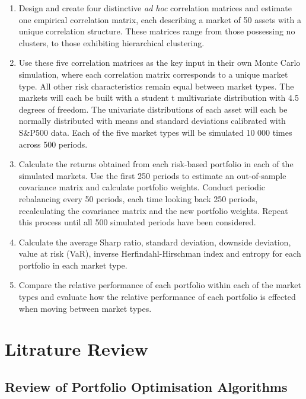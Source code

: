 \documentclass[11pt,preprint, authoryear]{elsarticle}
\numberwithin{equation}{section}
\numberwithin{figure}{section}
\numberwithin{table}{section}
\begin{document}
\begin{enumerate}
\def\labelenumi{\arabic{enumi}.}
\item
  Design and create four distinctive \emph{ad hoc} correlation matrices
  and estimate one empirical correlation matrix, each describing a
  market of 50 assets with a unique correlation structure. These
  matrices range from those possessing no clusters, to those exhibiting
  hierarchical clustering.
\item
  Use these five correlation matrices as the key input in their own
  Monte Carlo simulation, where each correlation matrix corresponds to a
  unique market type. All other risk characteristics remain equal
  between market types. The markets will each be built with a student t
  multivariate distribution with 4.5 degrees of freedom. The univariate
  distributions of each asset will each be normally distributed with
  means and standard deviations calibrated with S\&P500 data. Each of
  the five market types will be simulated 10 000 times across 500
  periods.
\item
  Calculate the returns obtained from each risk-based portfolio in each
  of the simulated markets. Use the first 250 periods to estimate an
  out-of-sample covariance matrix and calculate portfolio weights.
  Conduct periodic rebalancing every 50 periods, each time looking back
  250 periods, recalculating the covariance matrix and the new portfolio
  weights. Repeat this process until all 500 simulated periods have been
  considered.
\item
  Calculate the average Sharp ratio, standard deviation, downside
  deviation, value at risk (VaR), inverse Herfindahl-Hirschman index and
  entropy for each portfolio in each market type.
\item
  Compare the relative performance of each portfolio within each of the
  market types and evaluate how the relative performance of each
  portfolio is effected when moving between market types.
\end{enumerate}

\newpage

\hypertarget{litrature-review}{%
\section{\texorpdfstring{Litrature Review
\label{lit}}{Litrature Review }}\label{litrature-review}}

\hypertarget{review-of-portfolio-optimisation-algorithms}{%
\subsection{Review of Portfolio Optimisation
Algorithms}\label{review-of-portfolio-optimisation-algorithms}}
\end{document}
